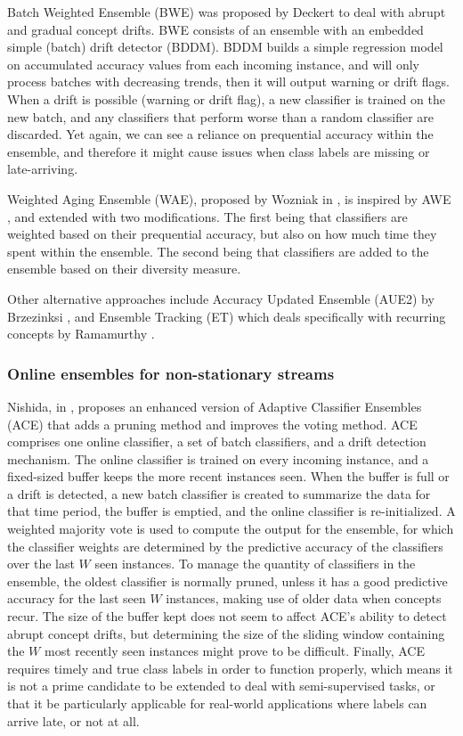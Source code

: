 Batch Weighted Ensemble (BWE) was proposed by Deckert \cite{deckert2011batch} to deal with abrupt and gradual concept drifts. BWE consists of an ensemble with an embedded simple (batch) drift detector (BDDM). BDDM builds a simple regression model on accumulated accuracy values from each incoming instance, and will only process batches with decreasing trends, then it will output warning or drift flags. When a drift is possible (warning or drift flag), a new classifier is trained on the new batch, and any classifiers that perform worse than a random classifier are discarded. Yet again, we can see a reliance on prequential accuracy within the ensemble, and therefore it might cause issues when class labels are missing or late-arriving.

Weighted Aging Ensemble (WAE), proposed by Wozniak in \cite{wozniak2013application}, is inspired by AWE \cite{wang2003mining}, and extended with two modifications. The first being that classifiers are weighted based on their prequential accuracy, but also on how much time they spent within the ensemble. The second being that classifiers are added to the ensemble based on their diversity measure.

Other alternative approaches include Accuracy Updated Ensemble (AUE2) by Brzezinksi \cite{brzezinski2014reacting}, and Ensemble Tracking (ET) which deals specifically with recurring concepts by Ramamurthy \cite{ramamurthy2007tracking}.

\subsubsection{Online ensembles for non-stationary streams}

Nishida, in \cite{nishida2007adaptive}, proposes an enhanced version of Adaptive Classifier Ensembles (ACE) that adds a pruning method and improves the voting method. ACE comprises one online classifier, a set of batch classifiers, and a drift detection mechanism. The online classifier is trained on every incoming instance, and a fixed-sized buffer keeps the more recent instances seen. When the buffer is full or a drift is detected, a new batch classifier is created to summarize the data for that time period, the buffer is emptied, and the online classifier is re-initialized. A weighted majority vote is used to compute the output for the ensemble, for which the classifier weights are determined by the predictive accuracy of the classifiers over the last $W$ seen instances. To manage the quantity of classifiers in the ensemble, the oldest classifier is normally pruned, unless it has a good predictive accuracy for the last seen $W$ instances, making use of older data when concepts recur. The size of the buffer kept does not seem to affect ACE's ability to detect abrupt concept drifts, but determining the size of the sliding window containing the $W$ most recently seen instances might prove to be difficult.
Finally, ACE requires timely and true class labels in order to function properly, which means it is not a prime candidate to be extended to deal with semi-supervised tasks, or that it be particularly applicable for real-world applications where labels can arrive late, or not at all.

